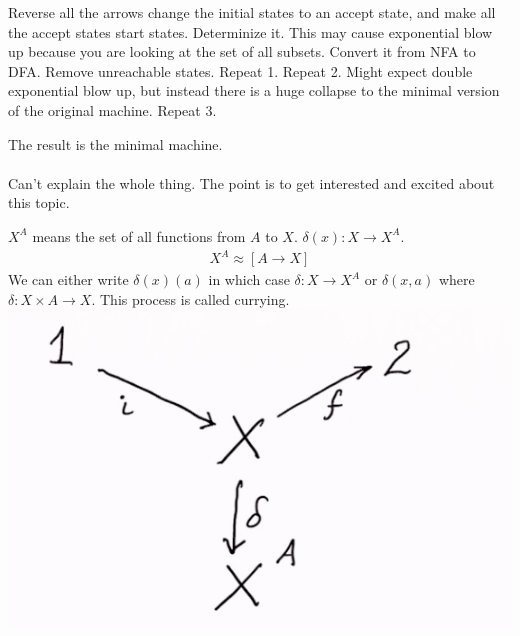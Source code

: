 \documentclass[../598comp.tex]{subfiles}
\begin{document}
\begin{enumerate}
  \ii
  Reverse all the arrows change the initial states to an accept state, and make all the accept states start states.
  \ii
  Determinize it. This may cause exponential blow up because you are looking at the set of all subsets. Convert it from NFA to DFA.
  \ii
  Remove unreachable states.
  \ii
  Repeat 1.
  \ii
  Repeat 2. Might expect double exponential blow up, but instead there is a huge collapse to the minimal version of the original machine.
  \ii
  Repeat 3.
\end{enumerate} 
The result is the minimal machine.
\\\\
Can't explain the whole thing. The point is to get interested and excited about this topic.

\begin{note}
  $X^A$ means the set of all functions from $A$ to $X$. $\delta(x): X \to X^A$.
  \begin{gather*}
    X^A \approx [A \to X]
  \end{gather*} 
  We can either write $\delta(x)(a)$ in which case $\delta:X \to X^A$ or $\delta(x, a)$ where $\delta: X \times A \to X$. This process is called currying. \\
  \includegraphics[width=\textwidth]{thisisanautomaton}
\end{note} 
\end{document}
